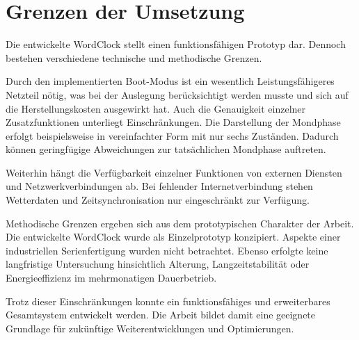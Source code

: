 \section{Grenzen der Umsetzung}
Die entwickelte WordClock stellt einen funktionsfähigen Prototyp dar.  
Dennoch bestehen verschiedene technische und methodische Grenzen.  

Durch den implementierten Boot-Modus ist ein wesentlich Leistungsfähigeres Netzteil nötig, was bei der Auslegung berücksichtigt werden musste und sich auf die Herstellungskosten ausgewirkt hat.  
Auch die Genauigkeit einzelner Zusatzfunktionen unterliegt Einschränkungen.  
Die Darstellung der Mondphase erfolgt beispielsweise in vereinfachter Form mit nur sechs Zuständen.  
Dadurch können geringfügige Abweichungen zur tatsächlichen Mondphase auftreten.  

Weiterhin hängt die Verfügbarkeit einzelner Funktionen von externen Diensten und Netzwerkverbindungen ab.  
Bei fehlender Internetverbindung stehen Wetterdaten und Zeitsynchronisation nur eingeschränkt zur Verfügung.  

Methodische Grenzen ergeben sich aus dem prototypischen Charakter der Arbeit.  
Die entwickelte WordClock wurde als Einzelprototyp konzipiert.  
Aspekte einer industriellen Serienfertigung wurden nicht betrachtet.  
Ebenso erfolgte keine langfristige Untersuchung hinsichtlich Alterung, Langzeitstabilität oder Energieeffizienz im mehrmonatigen Dauerbetrieb.  

Trotz dieser Einschränkungen konnte ein funktionsfähiges und erweiterbares Gesamtsystem entwickelt werden.  
Die Arbeit bildet damit eine geeignete Grundlage für zukünftige Weiterentwicklungen und Optimierungen.